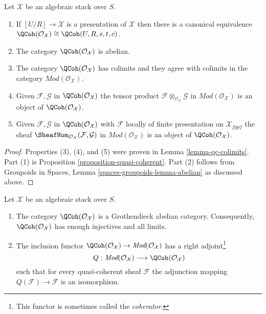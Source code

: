 \begin{lemma}
\label{lemma-quasi-coherent-algebraic-stack}
Let $\mathcal{X}$ be an algebraic stack over $S$.
\begin{enumerate}
\item If $[U/R] \to \mathcal{X}$ is a presentation of $\mathcal{X}$
then there is a canonical equivalence
$\QCoh(\mathcal{O}_\mathcal{X}) \cong
\QCoh(U, R, s, t, c)$.
\item The category $\QCoh(\mathcal{O}_\mathcal{X})$ is abelian.
\item The category $\QCoh(\mathcal{O}_\mathcal{X})$
has colimits and they agree with colimits in the category
$\textit{Mod}(\mathcal{O}_\mathcal{X})$.
\item Given $\mathcal{F}, \mathcal{G}$ in
$\QCoh(\mathcal{O}_\mathcal{X})$
the tensor product $\mathcal{F} \otimes_{\mathcal{O}_\mathcal{X}} \mathcal{G}$
in $\textit{Mod}(\mathcal{O}_\mathcal{X})$
is an object of $\QCoh(\mathcal{O}_\mathcal{X})$.
\item Given $\mathcal{F}, \mathcal{G}$ in
$\QCoh(\mathcal{O}_\mathcal{X})$
with $\mathcal{F}$ locally of finite presentation on
$\mathcal{X}_{fppf}$ the sheaf
$\SheafHom_{\mathcal{O}_\mathcal{X}}(\mathcal{F}, \mathcal{G})$
in $\textit{Mod}(\mathcal{O}_\mathcal{X})$
is an object of $\QCoh(\mathcal{O}_\mathcal{X})$.
\end{enumerate}
\end{lemma}

\begin{proof}
Properties (3), (4), and (5) were proven in
Lemma \ref{lemma-qc-colimits}.
Part (1) is
Proposition \ref{proposition-quasi-coherent}.
Part (2) follows from
Groupoids in Spaces, Lemma \ref{spaces-groupoids-lemma-abelian}
as discussed above.
\end{proof}

\begin{proposition}
\label{proposition-coherator}
Let $\mathcal{X}$ be an algebraic stack over $S$.
\begin{enumerate}
\item The category $\QCoh(\mathcal{O}_\mathcal{X})$ is a Grothendieck
abelian category. Consequently, $\QCoh(\mathcal{O}_\mathcal{X})$
has enough injectives and all limits.
\item The inclusion functor
$\QCoh(\mathcal{O}_\mathcal{X}) \to
\textit{Mod}(\mathcal{O}_\mathcal{X})$ has a right adjoint\footnote{This
functor is sometimes called the {\it coherator}.}
$$
Q :
\textit{Mod}(\mathcal{O}_\mathcal{X})
\longrightarrow
\QCoh(\mathcal{O}_\mathcal{X})
$$
such that for every quasi-coherent sheaf $\mathcal{F}$ the adjunction mapping
$Q(\mathcal{F}) \to \mathcal{F}$ is an isomorphism.
\end{enumerate}
\end{proposition}

